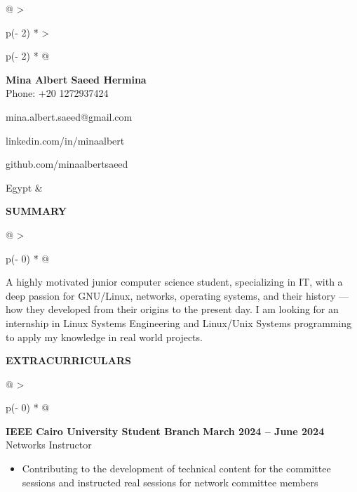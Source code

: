 \documentclass[a4paper]{article}
\begin{document}
\begin{longtable}[]{@{}
  >{\raggedright\arraybackslash}p{(\columnwidth - 2\tabcolsep) * }
  >{\raggedright\arraybackslash}p{(\columnwidth - 2\tabcolsep) * }@{}}
\endhead
\endlastfoot
\textbf{\LARGE{Mina Albert Saeed Hermina}}
\vspace{1pt} \\ 
Phone: +20 1272937424

mina.albert.saeed@gmail.com

linkedin.com/in/minaalbert

github.com/minaalbertsaeed

Egypt & \\
\end{longtable}
\vspace{-10pt}

\textbf{SUMMARY}
\vspace{-8pt}
\nopagebreak[4]
\begin{longtable}[]{@{}
  >{\raggedright\arraybackslash}p{(\columnwidth - 0\tabcolsep) * }@{}}
\toprule
\vspace{0pt}

A highly motivated junior computer science student, specializing in IT,
with a deep passion for GNU/Linux, networks, operating systems, and
their history --- how they developed from their origins to the present
day. I am looking for an internship in Linux Systems Engineering and
Linux/Unix Systems programming to apply my knowledge in real world
projects.
\end{longtable}
\vspace{-8pt}

\textbf{EXTRACURRICULARS}
\vspace{-7pt}
\nopagebreak[4]
\begin{longtable}[]{@{}
  >{\raggedright\arraybackslash}p{(\columnwidth - 0\tabcolsep) * }@{}
    }
\toprule\noalign{}
\endhead
\endlastfoot
\vspace{0pt}
\begin{minipage}[t]{\linewidth}\raggedright
    \textbf{IEEE Cairo University Student Branch} 
    \hspace{27em}\textbf{March 2024 -- June 2024} \\
    Networks Instructor
    \vspace{.05em}
\begin{itemize}
\item
  Contributing to the development of technical content for the committee
  sessions and instructed real sessions for network committee members
\end{itemize}
\end{minipage} \\
\end{longtable}
\vspace{-10pt}
\end{document}
